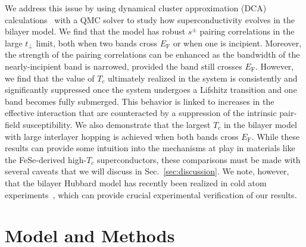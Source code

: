 \documentclass[prb,twocolumn,amsmath,amssymb,superscriptaddress,floatfix,nofootinbib]{revtex4-2}
\begin{document}
We address this issue by using dynamical cluster approximation (DCA) calculations~\cite{Jarrell2001, Maier_Review} with a QMC solver to study how superconductivity evolves in the bilayer model. We find that the model has robust $s^\pm$ pairing correlations in the large $t_\perp$ limit, both when two bands cross $E_\mathrm{F}$ or when one is incipient. Moreover, the strength of the pairing correlations can be enhanced as the bandwidth of the nearly-incipient band is narrowed, provided the band still crosses $E_\mathrm{F}$. However, we find that the value of $T_c$ ultimately realized in the system is consistently and significantly suppressed once the system undergoes a Lifshitz transition and one band becomes fully submerged. This behavior is linked to increases in the effective interaction that are counteracted by a suppression of the intrinsic pair-field susceptibility. We also demonstrate that the largest $T_c$ in the bilayer model with large interlayer hopping is achieved when both bands cross $E_\mathrm{F}$. While these results can provide some intuition into the mechanisms at play in materials like the FeSe-derived high-$T_c$ superconductors, these comparisons must be made with several caveats that we will discuss in Sec.~\ref{sec:discussion}. We note, however, that the bilayer Hubbard model has recently been realized in cold atom experiments~\cite{GallNature2021}, which can provide crucial experimental verification of our results. 

\section{Model and Methods}\label{Sec:Methods}
\end{document}
